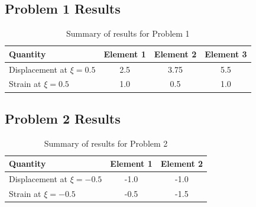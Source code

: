 \documentclass[12pt,a4paper]{article}
\begin{document}
\subsection{Problem 1 Results}

\begin{table}[H]
\centering
\begin{tabular}{lccc}
\toprule
\textbf{Quantity} & \textbf{Element 1} & \textbf{Element 2} & \textbf{Element 3} \\
\midrule
Displacement at $\xi = 0.5$ & 2.5 & 3.75 & 5.5 \\
Strain at $\xi = 0.5$ & 1.0 & 0.5 & 1.0 \\
\bottomrule
\end{tabular}
\caption{Summary of results for Problem 1}
\end{table}

\subsection{Problem 2 Results}

\begin{table}[H]
\centering
\begin{tabular}{lcc}
\toprule
\textbf{Quantity} & \textbf{Element 1} & \textbf{Element 2} \\
\midrule
Displacement at $\xi = -0.5$ & -1.0 & -1.0 \\
Strain at $\xi = -0.5$ & -0.5 & -1.5 \\
\bottomrule
\end{tabular}
\caption{Summary of results for Problem 2}
\end{table}
\end{document}
